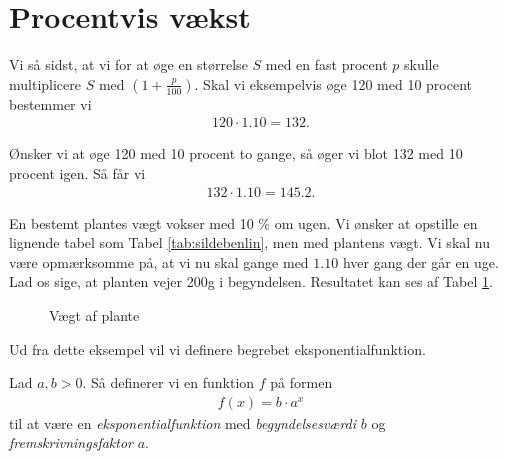 \section*{Procentvis vækst}

Vi så sidst, at vi for at øge en størrelse $S$ med en fast procent $p$ skulle multiplicere 
$S$ med $(1 + \frac{p}{100})$. Skal vi eksempelvis øge 120 med 10 procent bestemmer vi
\begin{align*}
	120 \cdot 1.10 = 132.
\end{align*}

Ønsker vi at øge 120 med 10 procent to gange, så øger vi blot 132 med 10 procent igen. Så får vi
\begin{align*}
	132 \cdot 1.10 = 145.2.
\end{align*}

\begin{exa}
	En bestemt plantes vægt vokser med 10 $\%$ om ugen. Vi ønsker at opstille en lignende tabel
	 som Tabel \ref{tab:sildebenlin}, men med plantens vægt. Vi skal nu være opmærksomme på, at  
	 vi nu skal gange med $1.10$ hver gang der går en uge. Lad os sige, at planten vejer 200g i 
	 begyndelsen. Resultatet kan ses af Tabel \ref{tab:sildebenplante}.
	 \begin{figure}[H]
		\center
		\caption{Vægt af plante}
		\label{tab:sildebenplante}
	\end{figure}
\end{exa}

Ud fra dette eksempel vil vi definere begrebet eksponentialfunktion.
\begin{defn}[Eksponentialfunktion]
	Lad $a,b>0$. Så definerer vi en funktion $f$ på formen 
	\begin{align*}
		f(x) = b\cdot a^x
	\end{align*}
	til at være en \textit{eksponentialfunktion} med \textit{begyndelsesværdi} $b$ og 
	\textit{fremskrivningsfaktor} $a$. 
\end{defn}

